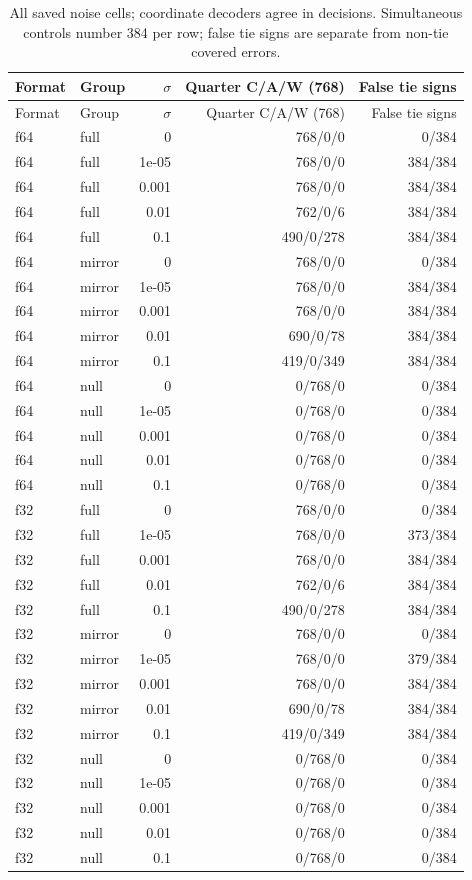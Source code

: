 \begin{longtable}{llrrr}
\caption{All saved noise cells; coordinate decoders agree in decisions. Simultaneous controls number 384 per row; false tie signs are separate from non-tie covered errors.}\\
\toprule Format & Group & $\sigma$ & Quarter C/A/W (768) & False tie signs\\\midrule\endfirsthead
\toprule Format & Group & $\sigma$ & Quarter C/A/W (768) & False tie signs\\\midrule\endhead
f64 & full & 0 & 768/0/0 & 0/384\\
f64 & full & 1e-05 & 768/0/0 & 384/384\\
f64 & full & 0.001 & 768/0/0 & 384/384\\
f64 & full & 0.01 & 762/0/6 & 384/384\\
f64 & full & 0.1 & 490/0/278 & 384/384\\
f64 & mirror & 0 & 768/0/0 & 0/384\\
f64 & mirror & 1e-05 & 768/0/0 & 384/384\\
f64 & mirror & 0.001 & 768/0/0 & 384/384\\
f64 & mirror & 0.01 & 690/0/78 & 384/384\\
f64 & mirror & 0.1 & 419/0/349 & 384/384\\
f64 & null & 0 & 0/768/0 & 0/384\\
f64 & null & 1e-05 & 0/768/0 & 0/384\\
f64 & null & 0.001 & 0/768/0 & 0/384\\
f64 & null & 0.01 & 0/768/0 & 0/384\\
f64 & null & 0.1 & 0/768/0 & 0/384\\
f32 & full & 0 & 768/0/0 & 0/384\\
f32 & full & 1e-05 & 768/0/0 & 373/384\\
f32 & full & 0.001 & 768/0/0 & 384/384\\
f32 & full & 0.01 & 762/0/6 & 384/384\\
f32 & full & 0.1 & 490/0/278 & 384/384\\
f32 & mirror & 0 & 768/0/0 & 0/384\\
f32 & mirror & 1e-05 & 768/0/0 & 379/384\\
f32 & mirror & 0.001 & 768/0/0 & 384/384\\
f32 & mirror & 0.01 & 690/0/78 & 384/384\\
f32 & mirror & 0.1 & 419/0/349 & 384/384\\
f32 & null & 0 & 0/768/0 & 0/384\\
f32 & null & 1e-05 & 0/768/0 & 0/384\\
f32 & null & 0.001 & 0/768/0 & 0/384\\
f32 & null & 0.01 & 0/768/0 & 0/384\\
f32 & null & 0.1 & 0/768/0 & 0/384\\
\bottomrule\end{longtable}
